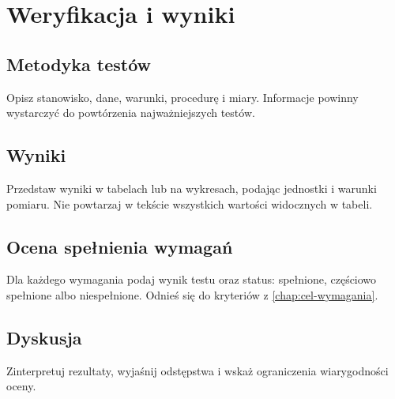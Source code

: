 \chapter{Weryfikacja i wyniki}
\label{chap:wyniki}

\section{Metodyka testów}
Opisz stanowisko, dane, warunki, procedurę i miary. Informacje powinny wystarczyć do powtórzenia najważniejszych testów.

\section{Wyniki}
Przedstaw wyniki w tabelach lub na wykresach, podając jednostki i warunki pomiaru. Nie powtarzaj w tekście wszystkich wartości widocznych w tabeli.

\section{Ocena spełnienia wymagań}
Dla każdego wymagania podaj wynik testu oraz status: spełnione, częściowo spełnione albo niespełnione. Odnieś się do kryteriów z \cref{chap:cel-wymagania}.

\section{Dyskusja}
Zinterpretuj rezultaty, wyjaśnij odstępstwa i wskaż ograniczenia wiarygodności oceny.
